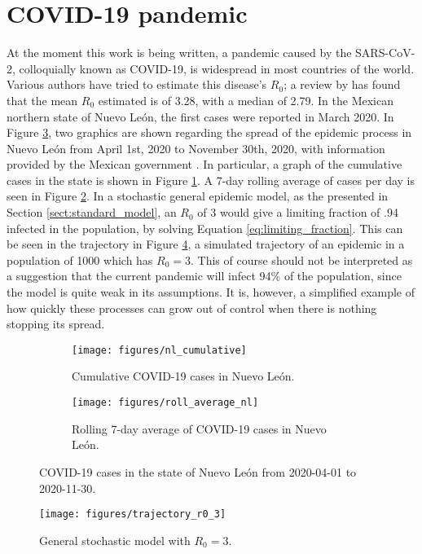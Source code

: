 \documentclass[aap]{imsart}
\theoremstyle{remark}
\begin{document}
\section{COVID-19 pandemic}\label{sect:covid}
At the moment this work is being written, a pandemic caused by the SARS-CoV-2, colloquially known as COVID-19, is widespread in most countries of the world. Various authors have tried to estimate this disease's $R_0$; a review by \citet{Liu_Gayle_2020} has found that the mean $R_0$ estimated is of 3.28, with a median of 2.79. In the Mexican northern state of Nuevo León, the first cases were reported in March 2020. In Figure \ref{fig:nl}, two graphics are shown regarding the spread of the epidemic process in Nuevo León from April 1st, 2020 to November 30th, 2020, with information provided by the Mexican government \citep{datos_covid}. In particular, a graph of the cumulative cases in the state is shown in Figure \ref{fig:nl_cum}. A 7-day rolling average of cases per day is seen in Figure \ref{fig:nl_roll}. In a stochastic general epidemic model, as the presented in Section \ref{sect:standard_model}, an $R_0$ of 3 would give a limiting fraction of .94 infected in the population, by solving Equation \ref{eq:limiting_fraction}. This can be seen in the trajectory in Figure \ref{fig:trajectory_r03_epidemic}, a simulated trajectory of an epidemic in a population of 1000 which has $R_0 = 3$. This of course should not be interpreted as a suggestion that the current pandemic will infect 94\% of the population, since the model is quite weak in its assumptions. It is, however, a simplified example of how quickly these processes can grow out of control when there is nothing stopping its spread.


\begin{figure}
	\centering
	\begin{subfigure}{0.45\linewidth}
		\texttt{[image: figures/nl\_cumulative]}
		\caption{Cumulative COVID-19 cases in Nuevo León.}
		\label{fig:nl_cum}
	\end{subfigure}
	\hfill
	\begin{subfigure}{0.45\linewidth}
		\texttt{[image: figures/roll\_average\_nl]}
		\caption{Rolling 7-day average of COVID-19 cases in Nuevo León.}
		\label{fig:nl_roll}
	\end{subfigure}
	\caption{COVID-19 cases in the state of Nuevo León from 2020-04-01 to 2020-11-30.} 
	\label{fig:nl}
\end{figure}

\begin{figure}
\centering
	\texttt{[image: figures/trajectory\_r0\_3]}
	\caption{General stochastic model with $R_0 = 3$.}
	\label{fig:trajectory_r03_epidemic}
\end{figure}
\end{document}
